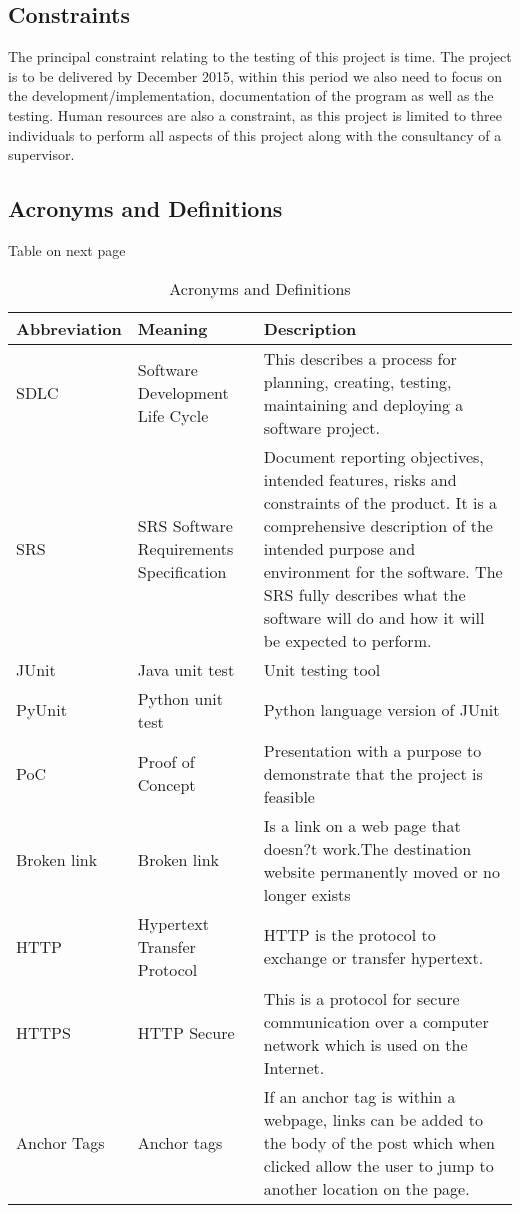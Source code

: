 \documentclass[12pt, titlepage]{article}
\begin{document}
\subsection{Constraints}
The principal constraint relating to the testing of this project is time. The project is to be delivered by December 2015, within this period we also need to focus on the development/implementation, documentation of the program as well as the testing. Human resources are also a  constraint, as this project is limited to three individuals to perform all aspects of this project along with the consultancy of a supervisor. \\

\subsection{Acronyms and Definitions}
Table on next page
 
\begin{table}[h!]
    \begin{tabular}{| p{5cm} | p{5cm} | p{5cm} |}    \hline
    Abbreviation&Meaning&Description\\ \hline
    SDLC&Software Development Life Cycle&This describes a process for planning, creating, testing, maintaining and deploying a software project.\\ \hline
SRS&SRS Software Requirements Specification&Document reporting objectives, intended features, risks and constraints of the product. It is a comprehensive description of the intended purpose and environment for the software. The SRS fully describes what the software will do and how it will be expected to perform.\\ \hline
JUnit&Java unit test&Unit testing tool\\ \hline
PyUnit&Python unit test&Python language version of JUnit\\ \hline
PoC&Proof of Concept&Presentation with a purpose to demonstrate that the project is feasible\\ \hline
Broken link&Broken link&Is a link on a web page that doesn?t work.The destination website permanently moved or no longer exists\\ \hline
HTTP&Hypertext Transfer Protocol&HTTP is the protocol to exchange or transfer hypertext.\\ \hline
HTTPS&HTTP Secure&This is a protocol for secure communication over a computer network which is used on the Internet.\\ \hline
Anchor Tags& Anchor tags&If  an anchor tag is within a webpage, links can be added to the body of the post which when clicked allow the user to jump to another location on the page.\\ \hline

    
       \end{tabular}
    \caption{Acronyms and Definitions}
\label{table:Acronyms and Definitions}
\end{table}
\end{document}
